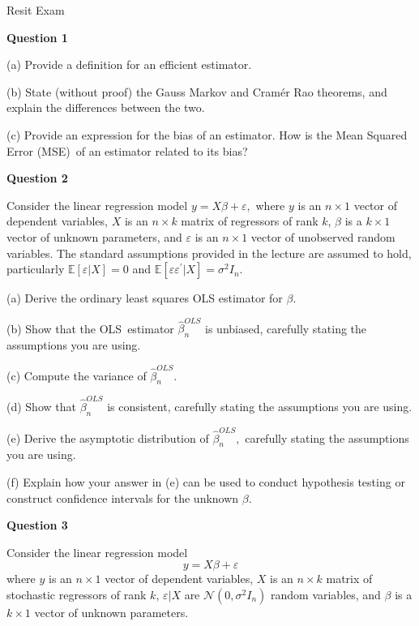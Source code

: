 \documentclass{article}
\begin{document}
\begin{center}
{\Large Resit Exam}
\end{center}

\textbf{Question 1}

(a) Provide a definition for an efficient estimator.

(b) State (without proof) the Gauss Markov and Cram\'{e}r Rao theorems, and
explain the differences between the two.

(c) Provide an expression for the bias of an estimator. How is the Mean
Squared Error (MSE)\ of an estimator related to its bias?

\bigskip

\textbf{Question 2}

Consider the linear regression model $y=X\beta +\varepsilon ,$ where $y$ is
an $n\times 1$ vector of dependent variables, $X$ is an $n\times k$ matrix
of regressors of rank $k$, $\beta $ is a $k\times 1$ vector of unknown
parameters, and $\varepsilon $ is an $n\times 1$ vector of unobserved random
variables. The standard assumptions provided in the lecture are assumed to
hold, particularly $\mathbb{E}\left[ \varepsilon |X\right] =0$ and $\mathbb{E%
}\left[ \varepsilon \varepsilon ^{\prime }|X\right] =\sigma ^{2}I_{n}.$

(a) Derive the ordinary least squares OLS estimator for $\beta .$

(b) Show that the OLS\ estimator $\hat{\beta}_{n}^{OLS}$ is unbiased,
carefully stating the assumptions you are using.

(c) Compute the variance of $\hat{\beta}_{n}^{OLS}.$

(d) Show that $\hat{\beta}_{n}^{OLS}$ is consistent, carefully stating the
assumptions you are using.

(e) Derive the asymptotic distribution of $\hat{\beta}_{n}^{OLS},$ carefully
stating the assumptions you are using$.$

(f) Explain how your answer in (e) can be used to conduct hypothesis testing
or construct confidence intervals for the unknown $\beta .$

\bigskip

\textbf{Question 3 }

Consider the linear regression model 
\begin{equation*}
y=X\beta +\varepsilon
\end{equation*}%
where $y$ is an $n\times 1$ vector of dependent variables, $X$ is an $%
n\times k$ matrix of stochastic regressors of rank $k$, $\varepsilon |X$ are 
$\mathcal{N}(0,\sigma ^{2}I_{n})$ random variables, and $\beta $ is a $%
k\times 1$ vector of unknown parameters$.$
\end{document}
